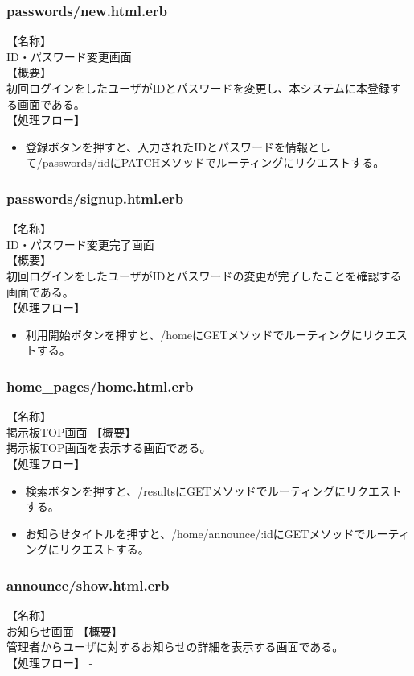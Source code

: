 \documentclass[a4j]{jarticle}
\begin{document}
\subsubsection{passwords/new.html.erb}
\noindent
【名称】\\
ID・パスワード変更画面\\
【概要】\\
初回ログインをしたユーザがIDとパスワードを変更し、本システムに本登録する画面である。\\
【処理フロー】
\begin{itemize}
  \item 登録ボタンを押すと、入力されたIDとパスワードを情報として/passwords/:idにPATCHメソッドでルーティングにリクエストする。
\end{itemize}

\subsubsection{passwords/signup.html.erb}
\noindent
【名称】\\
ID・パスワード変更完了画面\\
【概要】\\
初回ログインをしたユーザがIDとパスワードの変更が完了したことを確認する画面である。\\
【処理フロー】
\begin{itemize}
  \item 利用開始ボタンを押すと、/homeにGETメソッドでルーティングにリクエストする。
\end{itemize}


\subsubsection{home\_pages/home.html.erb}
\noindent
【名称】\\
掲示板TOP画面
【概要】\\
掲示板TOP画面を表示する画面である。\\
【処理フロー】
\begin{itemize}
  \item 検索ボタンを押すと、/resultsにGETメソッドでルーティングにリクエストする。
  \item お知らせタイトルを押すと、/home/announce/:idにGETメソッドでルーティングにリクエストする。
\end{itemize}

\subsubsection{announce/show.html.erb}
\noindent
【名称】\\
お知らせ画面
【概要】\\
管理者からユーザに対するお知らせの詳細を表示する画面である。\\
【処理フロー】
-
\end{document}
